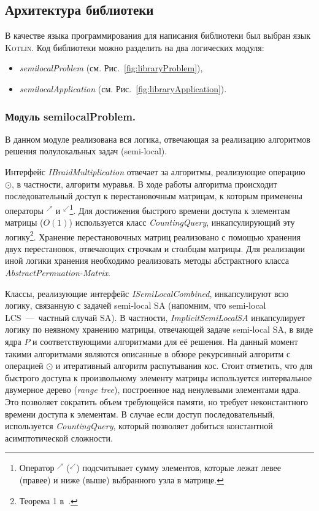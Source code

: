 
\subsection{Архитектура библиотеки}
В качестве языка программирования для написания библиотеки был выбран язык \textsc{Kotlin}.
Код библиотеки можно  разделить на два логических модуля:
\begin{itemize}
    \item \emph{semilocalProblem}  (см. Рис.~\ref{fig:libraryProblem}),
    \item \emph{semilocalApplication} (см. Рис.~\ref{fig:libraryApplication}).
\end{itemize}


\subsubsection{Модуль semilocalProblem.}
В данном модуле реализована вся логика, отвечающая за реализацию  алгоритмов решения полулокальных задач (semi-local).

Интерфейс \emph{IBraidMultiplication} отвечает за алгоритмы, реализующие операцию $\odot$, в частности, алгоритм муравья.
В ходе работы алгоритма происходит последовательный доступ к перестановочным матрицам, к которым применены операторы $^{\nearrow}$ и $^{\swarrow}$\footnote{Оператор $^{\nearrow}$ ($^{\swarrow}$)  подсчитывает сумму элементов, которые лежат левее (правее) и ниже (выше) выбранного узла в матрице.}.
Для достижения быстрого времени доступа к элементам  матрицы ($O(1)$) используется
класс \emph{CountingQuery}, инкапсулирующий эту логику\footnote{Теорема 1 в~\cite{tiskin2015fast}.}.
% 
Хранение перестановочных матриц реализовано с помощью хранения двух перестановок, отвечающих строчкам и столбцам матрицы.
Для реализации иной логики хранения необходимо реализовать методы абстрактного класса \emph{AbstractPermuation-Matrix}.

Классы, реализующие интерфейс \emph{ISemiLocalCombined}, инкапсулируют всю логику, связанную с задачей semi-local SA (напомним, что semi-local LCS~---~частный случай SA).
В частности, \emph{ImplicitSemiLocalSA} инкапсулирует логику по неявному хранению матрицы, отвечающей задаче semi-local SA, в виде ядра $P$ и соответствующими алгоритмами для её решения.
На данный момент такими алгоритмами являются описанные в обзоре рекурсивный алгоритм с операцией $\odot$ и итеративный алгоритм распутывания кос.
Стоит отметить, что для быстрого доступа к произвольному элементу матрицы  используется интервальное двумерное дерево (\emph{range tree}), построенное над ненулевыми элементами ядра.
Это позволяет сократить объем требующейся памяти, но требует неконстантного времени доступа к элементам.
В случае если доступ последовательный, используется  \emph{CountingQuery}, который позволяет добиться константной асимптотической сложности.

